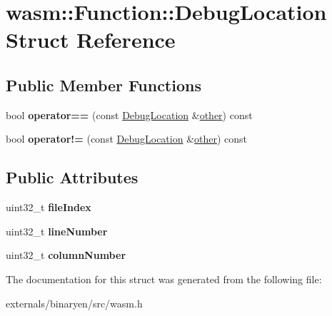 \hypertarget{structwasm_1_1_function_1_1_debug_location}{}\section{wasm\+:\+:Function\+:\+:Debug\+Location Struct Reference}
\label{structwasm_1_1_function_1_1_debug_location}
\subsection*{Public Member Functions}
\begin{DoxyCompactItemize}
\item 
\mbox{\label{structwasm_1_1_function_1_1_debug_location_a4c6eb5c8221875ed551442cfd3066c72}} 
bool {\bfseries operator==} (const \mbox{\hyperlink{structwasm_1_1_function_1_1_debug_location}{Debug\+Location}} \&\mbox{\hyperlink{structother}{other}}) const
\item 
\mbox{\label{structwasm_1_1_function_1_1_debug_location_a46b6fde03c56b6e96c566cfb66ea12fd}} 
bool {\bfseries operator!=} (const \mbox{\hyperlink{structwasm_1_1_function_1_1_debug_location}{Debug\+Location}} \&\mbox{\hyperlink{structother}{other}}) const
\end{DoxyCompactItemize}
\subsection*{Public Attributes}
\begin{DoxyCompactItemize}
\item 
\mbox{\label{structwasm_1_1_function_1_1_debug_location_a2b656466fefa97c081ed8151994ed43b}} 
uint32\+\_\+t {\bfseries file\+Index}
\item 
\mbox{\label{structwasm_1_1_function_1_1_debug_location_ae3b4d76955d24d4eacc969fd4e294fad}} 
uint32\+\_\+t {\bfseries line\+Number}
\item 
\mbox{\label{structwasm_1_1_function_1_1_debug_location_a2b561010a8577b6c47482dc9e5f54f95}} 
uint32\+\_\+t {\bfseries column\+Number}
\end{DoxyCompactItemize}


The documentation for this struct was generated from the following file\+:\begin{DoxyCompactItemize}
\item 
externals/binaryen/src/wasm.\+h\end{DoxyCompactItemize}
